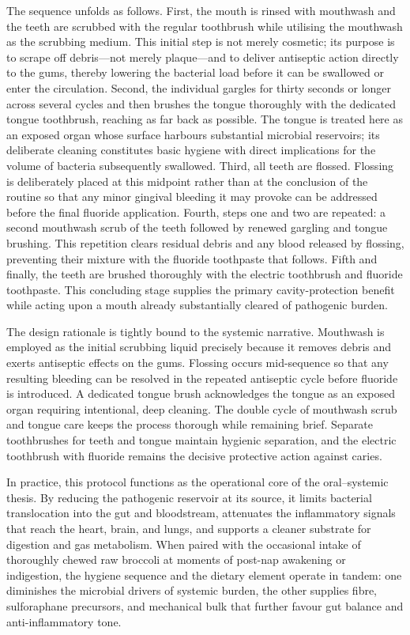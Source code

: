 \documentclass[11pt,a4paper]{article}
\begin{document}
The sequence unfolds as follows. First, the mouth is rinsed with mouthwash and the teeth are scrubbed with the regular toothbrush while utilising the mouthwash as the scrubbing medium. This initial step is not merely cosmetic; its purpose is to scrape off debris---not merely plaque---and to deliver antiseptic action directly to the gums, thereby lowering the bacterial load before it can be swallowed or enter the circulation. Second, the individual gargles for thirty seconds or longer across several cycles and then brushes the tongue thoroughly with the dedicated tongue toothbrush, reaching as far back as possible. The tongue is treated here as an exposed organ whose surface harbours substantial microbial reservoirs; its deliberate cleaning constitutes basic hygiene with direct implications for the volume of bacteria subsequently swallowed. Third, all teeth are flossed. Flossing is deliberately placed at this midpoint rather than at the conclusion of the routine so that any minor gingival bleeding it may provoke can be addressed before the final fluoride application. Fourth, steps one and two are repeated: a second mouthwash scrub of the teeth followed by renewed gargling and tongue brushing. This repetition clears residual debris and any blood released by flossing, preventing their mixture with the fluoride toothpaste that follows. Fifth and finally, the teeth are brushed thoroughly with the electric toothbrush and fluoride toothpaste. This concluding stage supplies the primary cavity-protection benefit while acting upon a mouth already substantially cleared of pathogenic burden.

The design rationale is tightly bound to the systemic narrative. Mouthwash is employed as the initial scrubbing liquid precisely because it removes debris and exerts antiseptic effects on the gums. Flossing occurs mid-sequence so that any resulting bleeding can be resolved in the repeated antiseptic cycle before fluoride is introduced. A dedicated tongue brush acknowledges the tongue as an exposed organ requiring intentional, deep cleaning. The double cycle of mouthwash scrub and tongue care keeps the process thorough while remaining brief. Separate toothbrushes for teeth and tongue maintain hygienic separation, and the electric toothbrush with fluoride remains the decisive protective action against caries.

In practice, this protocol functions as the operational core of the oral--systemic thesis. By reducing the pathogenic reservoir at its source, it limits bacterial translocation into the gut and bloodstream, attenuates the inflammatory signals that reach the heart, brain, and lungs, and supports a cleaner substrate for digestion and gas metabolism. When paired with the occasional intake of thoroughly chewed raw broccoli at moments of post-nap awakening or indigestion, the hygiene sequence and the dietary element operate in tandem: one diminishes the microbial drivers of systemic burden, the other supplies fibre, sulforaphane precursors, and mechanical bulk that further favour gut balance and anti-inflammatory tone.
\end{document}
